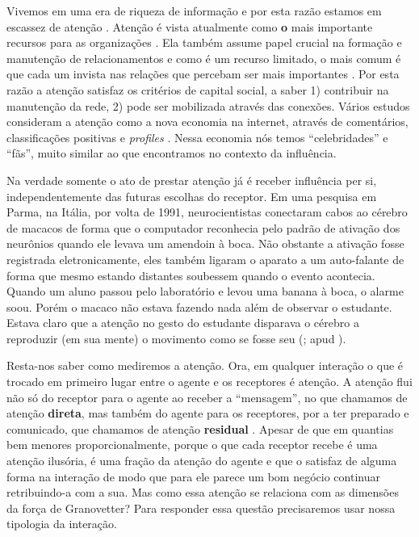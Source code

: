 Vivemos em uma era de riqueza de informação e por esta razão estamos em escassez
de atenção \citep{Goldhaber1997}. Atenção é vista atualmente como \textbf{o} mais
importante recursos para as organizações \citep{Davenport2001}. Ela também assume
papel crucial na formação e manutenção de relacionamentos e como é um recurso
limitado, o mais comum é que cada um invista nas relações que percebam ser mais
importantes \citep{Dindia1993}. Por esta razão a atenção satisfaz os critérios de
capital social, a saber 1) contribuir na manutenção da rede, 2) pode ser
mobilizada através das conexões. Vários estudos consideram a atenção como a nova
economia na internet, através de comentários, classificações positivas e
\textit{profiles} \citep{Humphreys2009, Wu2009, Skageby2009}. Nessa economia nós
temos ``celebridades'' e ``fãs'', muito similar ao que encontramos no contexto da
influência.

Na verdade somente o ato de prestar atenção já é receber influência per si,
independentemente das futuras escolhas do receptor. Em uma pesquisa em Parma, na
Itália, por volta de 1991, neurocientistas conectaram cabos ao cérebro de macacos
de forma que o computador reconhecia pelo padrão de ativação dos neurônios quando
ele levava um amendoin à boca. Não obstante a ativação fosse registrada
eletronicamente, eles também ligaram o aparato a um auto-falante de forma que
mesmo estando distantes soubessem quando o evento acontecia. Quando um aluno
passou pelo laboratório e levou uma banana à boca, o alarme soou. Porém o macaco
não estava fazendo nada além de observar o estudante. Estava claro que a atenção
no gesto do estudante disparava o cérebro a reproduzir (em sua mente) o movimento
como se fosse seu (\citealt{Rizzolatti1996}; apud \citealt{Goldhaber2006}).

Resta-nos saber como mediremos a atenção. Ora, em qualquer interação o que é
trocado em primeiro lugar entre o agente e os receptores é atenção. A atenção
flui não só do receptor para o agente ao receber a ``mensagem'', no que chamamos
de atenção \textbf{direta}, mas também do agente para os receptores, por a ter
preparado e comunicado, que chamamos de atenção \textbf{residual}
\citep{Goldhaber1997}. Apesar de que em quantias bem menores proporcionalmente,
porque o que cada receptor recebe é uma atenção ilusória, é uma fração da
atenção do agente e que o satisfaz de alguma forma na interação de modo que para
ele parece um bom negócio continuar retribuindo-a com a sua. Mas como essa
atenção se relaciona com as dimensões da força de Granovetter? Para responder
essa questão precisaremos usar nossa tipologia da interação.

